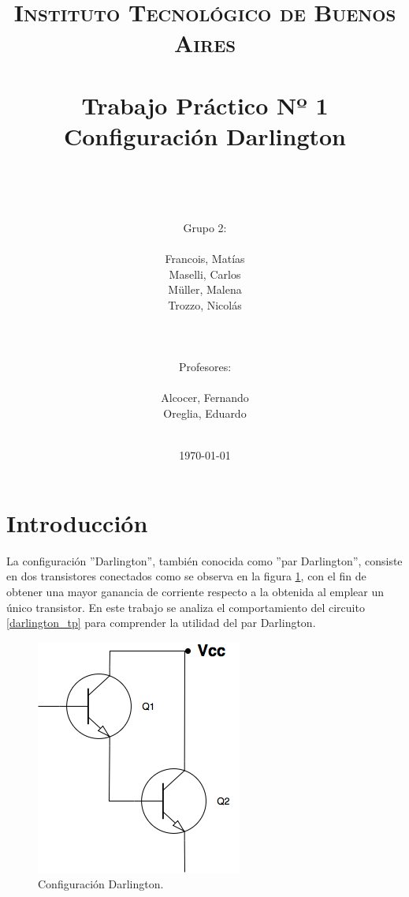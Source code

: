 



\title{
	\normalfont \normalsize \textsc{Instituto Tecnol\'ogico de Buenos Aires} \\ [25pt]
	\horrule{2pt} \\[0.4cm]
	\huge Trabajo Pr\'actico Nº 1\\ Configuraci\'on Darlington \\
	\horrule{2pt} \\[0cm]
\author{\\Grupo 2:\\\\Francois, Mat\'ias\\Maselli, Carlos\\ M\"uller, Malena\\ Trozzo, Nicol\'as\\ \\ \\ \\
Profesores: \\\\ Alcocer, Fernando\\ Oreglia, Eduardo \\ \\ } 
}
\date{\today} 

\maketitle
\newpage

\section{Introducci\'on}

La configuraci\'on ''Darlington'', tambi\'en conocida como ''par Darlington'', consiste en dos transistores conectados como se observa en la figura \ref{darlington_ideal}, con el fin de obtener una mayor ganancia de corriente respecto a la obtenida al emplear un \'unico transistor. En este trabajo se analiza el comportamiento del circuito \ref{darlington_tp} para comprender la utilidad del par Darlington.

\begin{figure}[H]
	\centering
		\includegraphics[scale=0.4]{../darlington_ideal.png} 
	\caption{Configuraci\'on Darlington.}
	\label{darlington_ideal}
\end{figure}

